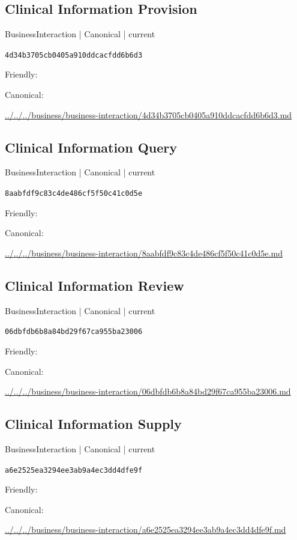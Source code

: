 \documentclass[10pt,a4paper]{article}
\begin{document}
\subsection*{Clinical Information Provision}
{\small BusinessInteraction | Canonical | current}\par
\texttt{4d34b3705cb0405a910ddcacfdd6b6d3}\par
Friendly: \par
Canonical: \par
{\footnotesize\url{../../../business/business-interaction/4d34b3705cb0405a910ddcacfdd6b6d3.md}}\par
\subsection*{Clinical Information Query}
{\small BusinessInteraction | Canonical | current}\par
\texttt{8aabfdf9c83c4de486cf5f50c41c0d5e}\par
Friendly: \par
Canonical: \par
{\footnotesize\url{../../../business/business-interaction/8aabfdf9c83c4de486cf5f50c41c0d5e.md}}\par
\subsection*{Clinical Information Review}
{\small BusinessInteraction | Canonical | current}\par
\texttt{06dbfdb6b8a84bd29f67ca955ba23006}\par
Friendly: \par
Canonical: \par
{\footnotesize\url{../../../business/business-interaction/06dbfdb6b8a84bd29f67ca955ba23006.md}}\par
\subsection*{Clinical Information Supply}
{\small BusinessInteraction | Canonical | current}\par
\texttt{a6e2525ea3294ee3ab9a4ec3dd4dfe9f}\par
Friendly: \par
Canonical: \par
{\footnotesize\url{../../../business/business-interaction/a6e2525ea3294ee3ab9a4ec3dd4dfe9f.md}}\par
\end{document}
